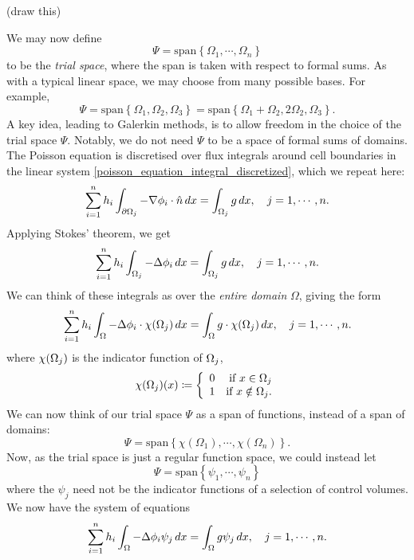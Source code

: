 \vskip 0.2in
(draw this)
\vskip 0.2in

We may now define
    $$\Psi = \text{span}\left\{\Omega_1,\cdots,\Omega_n\right\}$$
to be the \textit{trial space}, where the span is taken with respect to formal sums. As with a typical linear space,
we may choose from many possible bases. For example,
    $$\Psi = \text{span}\left\{\Omega_1, \Omega_2, \Omega_3\right\} =
    \text{span}\left\{\Omega_1 + \Omega_2, 2\Omega_2, \Omega_3\right\}.$$
A key idea, leading to Galerkin methods, is to allow freedom in the choice of the trial space $\Psi$.
Notably, we do not need $\Psi$ to be a space of formal sums of domains.
The Poisson equation is discretised over flux integrals around cell boundaries in the linear system \eqref{poisson_equation_integral_discretized},
which we repeat here:
\begin{align*}
    \sum_{i=1}^n h_i\int_{{\partial\Omega}_j} -\nabla \phi_i \cdot \hat{n}\,dx = \int_{{\Omega}_j} g\,dx,\quad j=1,\cdots,n.
\end{align*}
Applying Stokes' theorem, we get
\begin{align*}
    \sum_{i=1}^n h_i\int_{{\Omega}_j} -\Delta \phi_i \,dx = \int_{{\Omega}_j} g\,dx,\quad j=1,\cdots,n.
\end{align*}
We can think of these integrals as over the \textit{entire domain} $\Omega$, giving the form
\begin{align*}
    \sum_{i=1}^n h_i\int_{{\Omega}} -\Delta \phi_i\cdot \chi({\Omega}_j)\,dx = \int_{{\Omega}} g\cdot\chi({\Omega}_j)\,dx,\quad j=1,\cdots,n.
\end{align*}
where $\chi({\Omega}_j)$ is the indicator function of ${\Omega}_j$,
\begin{align*}
    \chi({\Omega}_j)(x) \coloneqq \left\{\begin{array}{lr}
        0 &\text{if $x \in {\Omega}_j$}\\
        1 &\text{if $x \notin {\Omega}_j$.}\\
        \end{array}\right.
\end{align*}
We can now think of our trial space $\Psi$ as a span of functions, instead of a span of domains:
    $$\Psi = \text{span}\left\{\chi(\Omega_1),\cdots,\chi(\Omega_n)\right\}.$$
Now, as the trial space is just a regular function space, we could instead let
    $$\Psi = \text{span}\left\{\psi_1,\cdots,\psi_n\right\}$$
where the $\psi_j$
need not be the indicator functions of a selection of control volumes. We now have the system of equations
\begin{align*}
    \sum_{i=1}^n h_i\int_{{\Omega}} -\Delta \phi_i \psi_j\,dx = \int_{{\Omega}} g\psi_j\,dx,\quad j=1,\cdots,n.
\end{align*}
